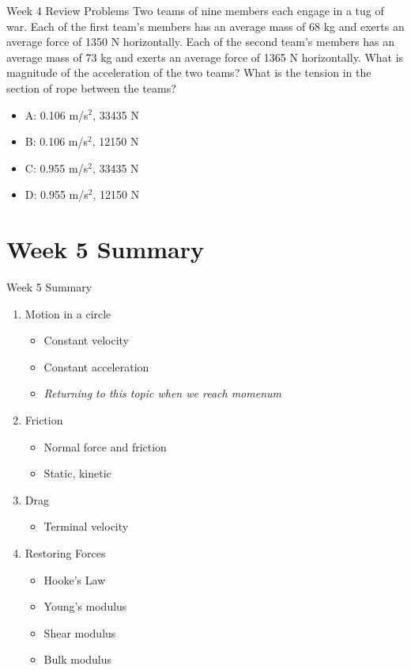 \documentclass{beamer}
\begin{document}
\begin{frame}{Week 4 Review Problems}
Two teams of nine members each engage in a tug of war.  Each of the first team’s members has an average mass of 68 kg and exerts an average force of 1350 N horizontally. Each of the second team’s members has an average mass of 73 kg and exerts an average force of 1365 N horizontally.  What is magnitude of the acceleration of the two teams?  What is the tension in the section of rope between the teams?
\begin{itemize}
\item A: 0.106 m/s$^2$, 33435 N
\item B: 0.106 m/s$^2$, 12150 N
\item C: 0.955 m/s$^2$, 33435 N
\item D: 0.955 m/s$^2$, 12150 N
\end{itemize}
\end{frame}

\section{Week 5 Summary}

\begin{frame}{Week 5 Summary}
\begin{enumerate}
\item \alert{Motion in a circle}
\begin{itemize}
\item Constant velocity
\item Constant acceleration
\item \textit{Returning to this topic when we reach \alert{momenum}}
\end{itemize}
\item \alert{Friction}
\begin{itemize}
\item Normal force and friction
\item Static, kinetic
\end{itemize}
\item \alert{Drag}
\begin{itemize}
\item Terminal velocity
\end{itemize}
\item \alert{Restoring Forces}
\begin{itemize}
\item Hooke's Law
\item Young's modulus
\item Shear modulus
\item Bulk modulus
\end{itemize}
\end{enumerate}
\end{frame}
\end{document}
